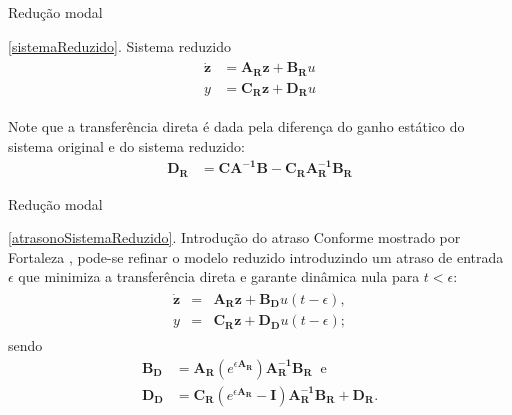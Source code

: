 \documentclass[10pt]{beamer}
\begin{document}
\begin{frame}[fragile]{Redução modal}
\begin{block}{\ref{sistemaReduzido}. Sistema reduzido}
	\begin{align}
	\begin{array}{ll}
	\dot{\mathbf{z}} &= \mathbf{A_R}\mathbf{z}+\mathbf{B_R}u\\
	y &= \mathbf{C_R}\mathbf{z}+\mathbf{D_R}u
	\end{array}
\end{align}
\end{block}
	Note que a transferência direta é dada pela diferença do ganho estático do sistema original e do sistema reduzido: \begin{align}
	\mathbf{D_R}&=\mathbf{C}\mathbf{A^{-1}}\mathbf{B}-\mathbf{C_R}\mathbf{A_R^{-1}}\mathbf{B_R}
	\end{align}
\end{frame}

\begin{frame}[fragile]{Redução modal}
\begin{block}{\ref{atrasonoSistemaReduzido}. Introdução do atraso}
Conforme mostrado por Fortaleza \cite{teseEugenio}, pode-se refinar o modelo reduzido introduzindo um atraso de entrada $\epsilon$ que minimiza a transferência direta e garante dinâmica nula para $t < \epsilon$: \begin{align}
\begin{array}{lll}
	\dot{\mathbf{z}} &=& \mathbf{A_R}\mathbf{z}+\mathbf{B_D}u(t-\epsilon),\\
	y &=& \mathbf{C_R}\mathbf{z}+\mathbf{D_D}u(t-\epsilon) \label{novoModeloReduzido};
\end{array}
\end{align} sendo \begin{align}
	\mathbf{B_D} &= \mathbf{A_R}\left(e^{\epsilon\mathbf{A_R}}\right)\mathbf{A_R^{-1}}\mathbf{B_R}\;\;\mathrm{e}\label{novoBD}\\
	\mathbf{D_D} &= \mathbf{C_R}\left(e^{\epsilon\mathbf{A_R}} - \mathbf{I}\right)\mathbf{A_R^{-1}}\mathbf{B_R} + \mathbf{D_R}\label{novoDD}.
\end{align}	
\end{block}
	
\end{frame}
\end{document}

